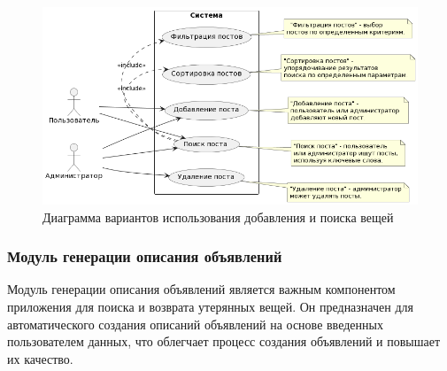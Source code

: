 \begin{figure}[htb]
	\centering
	\includegraphics[width=.9\textwidth]{images/seach-diagram-2.png}
	\parskip=6pt
	\caption{Диаграмма вариантов использования добавления и поиска вещей}
	\label{fig:searchDiagram2}
\end{figure}

\subsubsection{Модуль генерации описания объявлений}

Модуль генерации описания объявлений является важным компонентом приложения для поиска и возврата утерянных вещей. Он предназначен для автоматического создания описаний объявлений на основе введенных пользователем данных, что облегчает процесс создания объявлений и повышает их качество.

